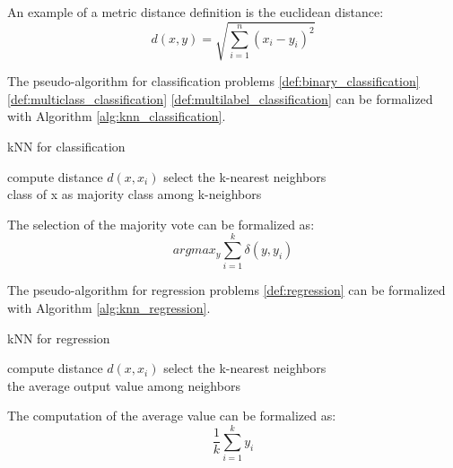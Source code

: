 An example of a metric distance definition is the euclidean distance:\\

$$d(x, y) = \sqrt{\sum_{i=1}^n (x_{i} - y_{i})^{2}}$$

The pseudo-algorithm for classification problems \ref{def:binary_classification} \ref{def:multiclass_classification} \ref{def:multilabel_classification} can be formalized with Algorithm \ref{alg:knn_classification}. 

\begin{algorithm}
\caption{kNN for classification \label{alg:knn_classification}}
\begin{algorithmic}
        \STATE compute distance $d(x, x_i)$
    \ENDFOR
    \STATE select the k-nearest neighbors\\
    \RETURN class of x as majority class among k-neighbors
\ENDFOR
\end{algorithmic}
\end{algorithm}

The selection of the majority vote can be formalized as:\\

\begin{equation}
    argmax_y {\sum_{i=1}^k \delta(y, y_{i})}
\end{equation}

The pseudo-algorithm for regression problems \ref{def:regression} can be formalized with Algorithm \ref{alg:knn_regression}. 

\begin{algorithm}
\caption{kNN for regression \label{alg:knn_regression}}
\begin{algorithmic}
        \STATE compute distance $d(x, x_i)$
    \ENDFOR
    \STATE select the k-nearest neighbors\\
    \RETURN the average output value among neighbors
\ENDFOR
\end{algorithmic}
\end{algorithm}

The computation of the average value can be formalized as:\\

$$\frac{1}{k} \sum_{i=1}^k y_{i}$$

